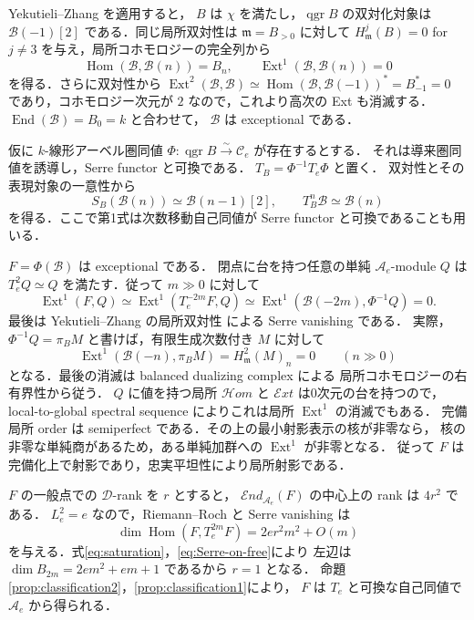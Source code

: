 Yekutieli--Zhang \cite[Theorem~4.2 and Corollary~4.3]{YZ1997} を適用すると，
$B$ は $\chi$ を満たし，$\operatorname{qgr}B$ の双対化対象は
$\mathcal B(-1)[2]$ である．同じ局所双対性は
$\mathfrak m=B_{>0}$ に対して
$H_{\mathfrak m}^j(B)=0$ for $j\ne3$ を与え，局所コホモロジーの完全列から
\begin{equation}
 \operatorname{Hom}(\mathcal B,\mathcal B(n))=B_n,\qquad
 \operatorname{Ext}^1(\mathcal B,\mathcal B(n))=0
 \label{eq:saturation}
\end{equation}
を得る．さらに双対性から
$\operatorname{Ext}^2(\mathcal B,\mathcal B)
\simeq\operatorname{Hom}(\mathcal B,\mathcal B(-1))^*=B_{-1}^*=0$
であり，コホモロジー次元が $2$ なので，これより高次の Ext も消滅する．
$\operatorname{End}(\mathcal B)=B_0=k$ と合わせて，
$\mathcal B$ は exceptional である．

仮に $k$-線形アーベル圏同値
$\Phi:\operatorname{qgr}B\xrightarrow{\sim}\mathcal C_e$ が存在するとする．
それは導来圏同値を誘導し，Serre functor と可換である．
$T_B=\Phi^{-1}T_e\Phi$ と置く．
双対性とその表現対象の一意性から
\begin{equation}
 S_B(\mathcal B(n))\simeq\mathcal B(n-1)[2],\qquad
 T_B^n\mathcal B\simeq\mathcal B(n)
 \label{eq:Serre-on-free}
\end{equation}
を得る．ここで第1式は次数移動自己同値が Serre functor と可換であることも用いる．

$F=\Phi(\mathcal B)$ は exceptional である．
閉点に台を持つ任意の単純 $\mathcal A_e$-module $Q$ は
$T_e^2Q\simeq Q$ を満たす．従って $m\gg0$ に対して
\[
 \operatorname{Ext}^1(F,Q)
 \simeq\operatorname{Ext}^1(T_e^{-2m}F,Q)
 \simeq\operatorname{Ext}^1(\mathcal B(-2m),\Phi^{-1}Q)=0.
\]
最後は Yekutieli--Zhang の局所双対性
\cite[Theorem~4.2(1)]{YZ1997} による Serre vanishing である．
実際，$\Phi^{-1}Q=\pi_B M$ と書けば，有限生成次数付き $M$ に対して
\[
 \operatorname{Ext}^1(\mathcal B(-n),\pi_B M)
 =H^2_{\mathfrak m}(M)_n=0\qquad(n\gg0)
\]
となる．最後の消滅は balanced dualizing complex による
局所コホモロジーの右有界性から従う．
$Q$ に値を持つ局所 $\mathcal Hom$ と $\mathcal Ext$ は0次元の台を持つので，
local-to-global spectral sequence によりこれは局所 $\operatorname{Ext}^1$ の消滅でもある．
完備局所 order は semiperfect である．その上の最小射影表示の核が非零なら，
核の非零な単純商があるため，ある単純加群への $\operatorname{Ext}^1$ が非零となる．
従って $F$ は完備化上で射影であり，忠実平坦性により局所射影である．

$F$ の一般点での $\mathscr D$-rank を $r$ とすると，
$\mathcal End_{\mathcal A_e}(F)$ の中心上の rank は $4r^2$ である．
$L_e^2=e$ なので，Riemann--Roch と Serre vanishing は
\[
 \dim\operatorname{Hom}(F,T_e^{2m}F)
 =2er^2m^2+O(m)
\]
を与える．式\eqref{eq:saturation}，\eqref{eq:Serre-on-free}により
左辺は $\dim B_{2m}=2em^2+em+1$ であるから $r=1$ となる．
命題\ref{prop:classification2}，\ref{prop:classification1}により，
$F$ は $T_e$ と可換な自己同値で $\mathcal A_e$ から得られる．

